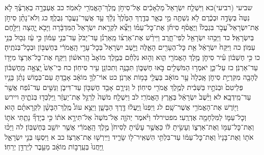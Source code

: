 \documentclass[twoside, openany, parskip=half, 11pt]{book}
\begin{document}
שביעי (רביעי)כא וַיִּשְׁלַ֤ח יִשְׂרָאֵל֙ מַלְאָכִ֔ים אֶל־סִיחֹ֥ן מֶֽלֶךְ־הָאֱמֹרִ֖י לֵאמֹֽר׃ כב אֶעְבְּרָ֣ה בְאַרְצֶ֗ךָ לֹ֤א נִטֶּה֙ בְּשָׂדֶ֣ה וּבְכֶ֔רֶם לֹ֥א נִשְׁתֶּ֖ה מֵ֣י בְאֵ֑ר בְּדֶ֤רֶךְ הַמֶּ֙לֶךְ֙ נֵלֵ֔ךְ עַ֥ד אֲשֶֽׁר־נַעֲבֹ֖ר גְּבֻלֶֽךָ׃ כג וְלֹא־נָתַ֨ן סִיחֹ֣ן אֶת־יִשְׂרָאֵל֮ עֲבֹ֣ר בִּגְבֻלוֹ֒ וַיֶּאֱסֹ֨ף סִיחֹ֜ן אֶת־כׇּל־עַמּ֗וֹ וַיֵּצֵ֞א לִקְרַ֤את יִשְׂרָאֵל֙ הַמִּדְבָּ֔רָה וַיָּבֹ֖א יָ֑הְצָה וַיִּלָּ֖חֶם בְּיִשְׂרָאֵֽל׃ כד וַיַּכֵּ֥הוּ יִשְׂרָאֵ֖ל לְפִי־חָ֑רֶב וַיִּירַ֨שׁ אֶת־אַרְצ֜וֹ מֵֽאַרְנֹ֗ן עַד־יַבֹּק֙ עַד־בְּנֵ֣י עַמּ֔וֹן כִּ֣י עַ֔ז גְּב֖וּל בְּנֵ֥י עַמּֽוֹן׃ כה וַיִּקַּח֙ יִשְׂרָאֵ֔ל אֵ֥ת כׇּל־הֶעָרִ֖ים הָאֵ֑לֶּה וַיֵּ֤שֶׁב יִשְׂרָאֵל֙ בְּכׇל־עָרֵ֣י הָֽאֱמֹרִ֔י בְּחֶשְׁבּ֖וֹן וּבְכׇל־בְּנֹתֶֽיהָ׃ כו כִּ֣י חֶשְׁבּ֔וֹן עִ֗יר סִיחֹ֛ן מֶ֥לֶךְ הָאֱמֹרִ֖י הִ֑וא וְה֣וּא נִלְחַ֗ם בְּמֶ֤לֶךְ מוֹאָב֙ הָֽרִאשׁ֔וֹן וַיִּקַּ֧ח אֶת־כׇּל־אַרְצ֛וֹ מִיָּד֖וֹ עַד־אַרְנֹֽן׃ כז עַל־כֵּ֛ן יֹאמְר֥וּ הַמֹּשְׁלִ֖ים בֹּ֣אוּ חֶשְׁבּ֑וֹן תִּבָּנֶ֥ה וְתִכּוֹנֵ֖ן עִ֥יר סִיחֽוֹן׃ כח כִּי־אֵשׁ֙ יָֽצְאָ֣ה מֵֽחֶשְׁבּ֔וֹן לֶהָבָ֖ה מִקִּרְיַ֣ת סִיחֹ֑ן אָֽכְלָה֙ עָ֣ר מוֹאָ֔ב בַּעֲלֵ֖י בָּמ֥וֹת אַרְנֹֽן׃ כט אוֹי־לְךָ֣ מוֹאָ֔ב אָבַ֖דְתָּ עַם־כְּמ֑וֹשׁ נָתַ֨ן בָּנָ֤יו פְּלֵיטִם֙ וּבְנֹתָ֣יו בַּשְּׁבִ֔ית לְמֶ֥לֶךְ אֱמֹרִ֖י סִיחֽוֹן׃ ל וַנִּירָ֛ם אָבַ֥ד חֶשְׁבּ֖וֹן עַד־דִּיבֹ֑ן וַנַּשִּׁ֣ים עַד־נֹ֔פַח אֲשֶׁ֖רׄ עַד־מֵֽידְבָֽא׃ לא וַיֵּ֙שֶׁב֙ יִשְׂרָאֵ֔ל בְּאֶ֖רֶץ הָאֱמֹרִֽי׃ לב וַיִּשְׁלַ֤ח מֹשֶׁה֙ לְרַגֵּ֣ל אֶת־יַעְזֵ֔ר וַֽיִּלְכְּד֖וּ בְּנֹתֶ֑יהָ ויירש וַיּ֖וֹרֶשׁ אֶת־הָאֱמֹרִ֥י אֲשֶׁר־שָֽׁם׃ לג וַיִּפְנוּ֙ וַֽיַּעֲל֔וּ דֶּ֖רֶךְ הַבָּשָׁ֑ן וַיֵּצֵ֣א עוֹג֩ מֶֽלֶךְ־הַבָּשָׁ֨ן לִקְרָאתָ֜ם ה֧וּא וְכׇל־עַמּ֛וֹ לַמִּלְחָמָ֖ה אֶדְרֶֽעִי׃ מפטירלד וַיֹּ֨אמֶר יְהֹוָ֤ה אֶל־מֹשֶׁה֙ אַל־תִּירָ֣א אֹת֔וֹ כִּ֣י בְיָדְךָ֞ נָתַ֧תִּי אֹת֛וֹ וְאֶת־כׇּל־עַמּ֖וֹ וְאֶת־אַרְצ֑וֹ וְעָשִׂ֣יתָ לּ֔וֹ כַּאֲשֶׁ֣ר עָשִׂ֗יתָ לְסִיחֹן֙ מֶ֣לֶךְ הָֽאֱמֹרִ֔י אֲשֶׁ֥ר יוֹשֵׁ֖ב בְּחֶשְׁבּֽוֹן׃ לה וַיַּכּ֨וּ אֹת֤וֹ וְאֶת־בָּנָיו֙ וְאֶת־כׇּל־עַמּ֔וֹ עַד־בִּלְתִּ֥י הִשְׁאִֽיר־ל֖וֹ שָׂרִ֑יד וַיִּֽירְשׁ֖וּ אֶת־אַרְצֽוֹ׃ כב א וַיִּסְע֖וּ בְּנֵ֣י יִשְׂרָאֵ֑ל וַֽיַּחֲנוּ֙ בְּעַֽרְב֣וֹת מוֹאָ֔ב מֵעֵ֖בֶר לְיַרְדֵּ֥ן יְרֵחֽוֹ׃
\end{document}

